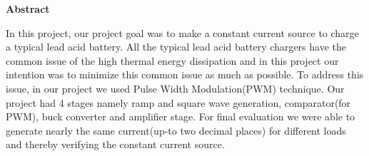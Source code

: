 \documentclass[a4paper,12pt]{article}
\begin{document}
\newpage
{}
\begin{flushleft}
\large\textbf{Abstract}\\
\end{flushleft}
\small{\hspace{2cm}In this project, our project goal was to make a constant current source to charge a typical lead acid battery. All the typical lead acid battery chargers have the common issue of the high thermal energy dissipation and in this project our intention was to minimize this common issue as much as possible. To address this issue, in our project we used Pulse Width Modulation(PWM) technique. Our project had 4 stages namely ramp and square wave generation, comparator(for PWM), buck converter and amplifier stage. For final evaluation we were able to generate nearly the same current(up-to two decimal places) for different loads and thereby verifying the constant current source.}
\newpage
\tableofcontents
\newpage
\listoffigures
\newpage
{}
\end{document}
